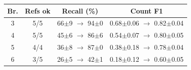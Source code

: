 \begin{tabular}{@{}cccc@{}}
\toprule
Br. & Refs ok & Recall (\%) & Count F1\\
\midrule
3 & 5/5 & 66$\pm$9 $\rightarrow$ 94$\pm$0 & 0.68$\pm$0.06 $\rightarrow$ 0.82$\pm$0.04\\
4 & 5/5 & 45$\pm$6 $\rightarrow$ 86$\pm$6 & 0.54$\pm$0.07 $\rightarrow$ 0.80$\pm$0.05\\
5 & 4/4 & 36$\pm$8 $\rightarrow$ 87$\pm$0 & 0.38$\pm$0.18 $\rightarrow$ 0.78$\pm$0.04\\
6 & 3/5 & 26$\pm$5 $\rightarrow$ 42$\pm$1 & 0.18$\pm$0.12 $\rightarrow$ 0.60$\pm$0.05\\
\bottomrule
\end{tabular}
